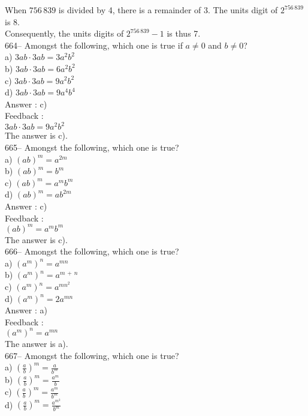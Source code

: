\documentclass[letterpaper, 12pt]{article}
\begin{document}
When $756\,839$ is divided by 4, there is a remainder of 3. The units digit of $2^{756\,839}$ is 8.\\
Consequently, the units digits of $2^{756\,839}-1$ is thus 7.  \\

664-- Amongst the following, which one is true if
$a\neq0$ and $b \neq 0$?\\
a) $3ab\cdot3ab=3a^{2}b^{2}$\\
b) $3ab\cdot3ab=6a^{2}b^{2}$\\
c) $3ab\cdot3ab=9a^{2}b^{2}$\\
d) $3ab\cdot3ab= 9a^{4}b^{4}$\\

Answer : c)\\

Feedback : \\
$3ab\cdot3ab=9a^{2}b^{2}$\\
The answer is c).\\

665-- Amongst the following, which one is true?\\
a) $\left( ab\right) ^m=a^{2m}$\\
b) $\left( ab\right) ^m=b^{m}$\\
c) $\left( ab\right) ^m=a^{m}b^{m}$\\
d) $\left( ab\right) ^m=ab^{2m}$\\

Answer : c)\\

Feedback : \\
$\left( ab\right) ^m=a^{m}b^{m}$\\
The answer is c).\\

666-- Amongst the following, which one is true?\\
a) $\left( a^{m}\right)^{n}=a^{mn}$ \\
b) $\left( a^{m}\right)^{n}=a^{m\,+\,n}$ \\
c) $\left( a^{m}\right)^{n}=a^{mn^{2}}$ \\
d) $\left( a^{m}\right)^{n}=2a^{mn}$ \\

Answer : a)\\

Feedback : \\
$\left( a^{m}\right)^{n}=a^{mn}$ \\
The answer is a).\\

667-- Amongst the following, which one is true?\\
a) $\left( \frac{a}{b}\right)^{m} =\frac{a}{b^{m}}$\\[2mm]
b) $\left( \frac{a}{b}\right)^{m} =\frac{a^{m}}{b}$\\[2mm]
c) $\left( \frac{a}{b}\right)^{m} =\frac{a^{m}}{b^{m}}$\\[2mm]
d) $\left( \frac{a}{b}\right)^{m} =\frac{a^{m^{2}}}{b^{m}}$\\
\end{document}
